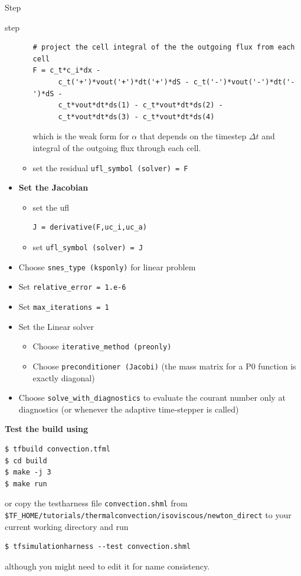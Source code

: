 \begin{steps}{Step}
\begin{steps}{step}
\begin{itemize}
\begin{itemize}
\begin{lstlisting}[style=UFL]
# project the cell integral of the the outgoing flux from each cell
F = c_t*c_i*dx - 
      c_t('+')*vout('+')*dt('+')*dS - c_t('-')*vout('-')*dt('-')*dS - 
      c_t*vout*dt*ds(1) - c_t*vout*dt*ds(2) - 
      c_t*vout*dt*ds(3) - c_t*vout*dt*ds(4)
    \end{lstlisting}
which is the weak form for $\alpha$ that depends on the timestep
$\Delta t$ and integral of the outgoing flux through each cell.
\item set the residual \texttt{ufl\_symbol (solver) = F}
\end{itemize}
\item \textbf{Set the Jacobian}
\begin{itemize}
\item set the ufl 
\begin{lstlisting}[style=UFL]
J = derivative(F,uc_i,uc_a)
    \end{lstlisting}
\item set \texttt{ufl\_symbol (solver) = J}
        \end{itemize}
      \item Choose \texttt{snes\_type (ksponly)} for linear problem
      \item Set \texttt{relative\_error = 1.e-6}
      \item Set \texttt{max\_iterations = 1}

      \item Set the Linear solver
        \begin{itemize}
        \item Choose \texttt{iterative\_method (preonly)}
        \item Choose \texttt{preconditioner (Jacobi)} (the mass matrix
          for a P0 function is exactly diagonal)
        \end{itemize}
      \item Choose \texttt{solve\_with\_diagnostics} to evaluate the
        courant number only at diagnostics (or whenever the adaptive
        time-stepper is called)
        \end{itemize}

   \end{steps}
  \item \textbf{Test the build using}
   \begin{lstlisting}[style=Bash]
$ tfbuild convection.tfml
$ cd build
$ make -j 3
$ make run
   \end{lstlisting}
or copy the testharness file \texttt{convection.shml} from
\texttt{\$TF\_HOME/tutorials/thermalconvection/isoviscous/newton\_direct}
to your current working directory and run
\begin{lstlisting}[style=Bash]
  $ tfsimulationharness --test convection.shml 
\end{lstlisting}
although you might need to edit it for name consistency.

\end{steps}


